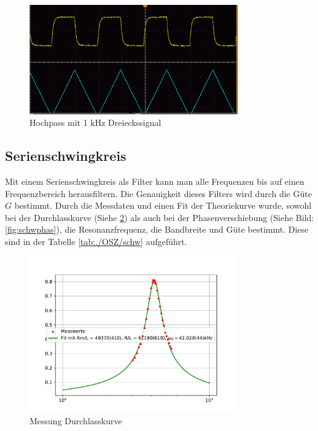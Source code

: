 \documentclass[11pt, a4paper]{article}
\begin{document}
    \begin{figure}[h]
        \centering
        \includegraphics[width=0.8\textwidth]{Hochpass_differenzierend_tri.png}
        \caption{Hochpass mit 1 $\si{\kilo\hertz}$ Dreieckssignal}
        \label{im:Hotri}
    \end{figure}

    \subsection{Serienschwingkreis}
    Mit einem Serienschwingkreis als Filter kann man alle Frequenzen bis auf einen Frequenzbereich herausfiltern. Die Genauigkeit dieses Filters wird durch die Güte $G$ bestimmt. Durch die Messdaten und einen Fit der Theoriekurve wurde, sowohl bei der Durchlasskurve (Siehe \ref{fig:schwdur}) als auch bei der Phasenverschiebung (Siehe Bild: \ref{fig:schwphas}), die Resonanzfrequenz, die Bandbreite und Güte bestimmt. Diese sind in der Tabelle \ref{tab:./OSZ/schw} aufgeführt.
    
    

    \begin{figure}
        \centering
        \includegraphics[width=0.8\textwidth]{schwdurch.pdf}
        \caption{Messung Durchlasskurve}
        \label{fig:schwdur}
    \end{figure}
\end{document}
